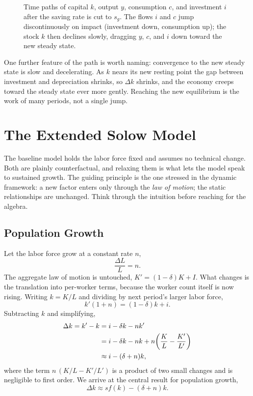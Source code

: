 \begin{figure}[h]
\centering

\caption{Time paths of capital $k$, output $y$, consumption $c$, and investment $i$ after the saving rate is cut to $s_g$. The flows $i$ and $c$ jump discontinuously on impact (investment down, consumption up); the stock $k$ then declines slowly, dragging $y$, $c$, and $i$ down toward the new steady state.}
\label{fig:macro-4}
\end{figure}

One further feature of the path is worth naming: convergence to the new steady state is slow and decelerating. As $k$ nears its new resting point the gap between investment and depreciation shrinks, so $\Delta k$ shrinks, and the economy creeps toward the steady state ever more gently. Reaching the new equilibrium is the work of many periods, not a single jump.

\section{The Extended Solow Model}

The baseline model holds the labor force fixed and assumes no technical change. Both are plainly counterfactual, and relaxing them is what lets the model speak to sustained growth. The guiding principle is the one stressed in the dynamic framework: a new factor enters only through the \emph{law of motion}; the static relationships are unchanged. Think through the intuition before reaching for the algebra.

\subsection{Population Growth}

Let the labor force grow at a constant rate $n$,
\[
\frac{\Delta L}{L} = n.
\]
The aggregate law of motion is untouched, $K' = (1-\delta) K + I$. What changes is the translation into per-worker terms, because the worker count itself is now rising. Writing $k = K/L$ and dividing by next period's larger labor force,
\[
k'(1 + n) = (1-\delta) k + i.
\]
Subtracting $k$ and simplifying,
\[
\begin{aligned}
\Delta k = k' - k
&= i - \delta k - n k' \\
&= i - \delta k - n k + n\!\left(\frac{K}{L} - \frac{K'}{L'}\right) \\
&\approx i - (\delta + n) k,
\end{aligned}
\]
where the term $n\,(K/L - K'/L')$ is a product of two small changes and is negligible to first order. We arrive at the central result for population growth,
\begin{equation}
\Delta k \approx s f(k) - (\delta + n) k.
\label{eq:solow-popn}
\end{equation}

